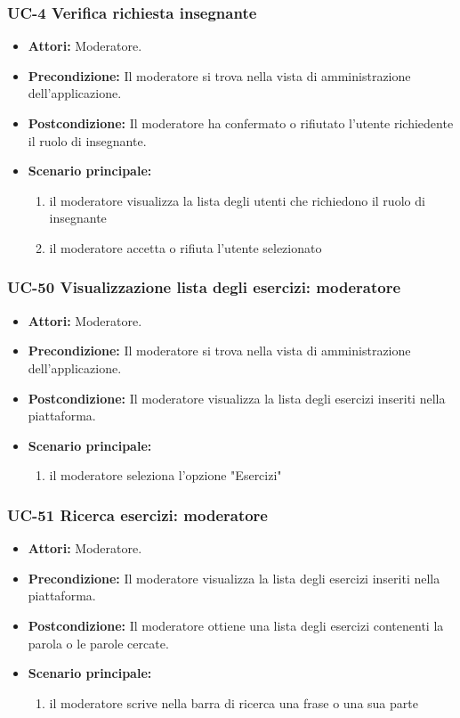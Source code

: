 \subsubsection{UC-4 Verifica richiesta insegnante}
		\begin{itemize}
			\item \textbf{Attori:} Moderatore.
			\item \textbf{Precondizione:} Il moderatore si trova nella vista di amministrazione dell'applicazione.
			\item \textbf{Postcondizione:} Il moderatore ha confermato o rifiutato l'utente richiedente il ruolo di insegnante.
			\item \textbf{Scenario principale:}
				\begin{enumerate}
					\item il moderatore visualizza la lista degli utenti che richiedono il ruolo di insegnante
					\item il moderatore accetta o rifiuta l'utente selezionato
				\end{enumerate}
		\end{itemize}		
			
\subsubsection{UC-50 Visualizzazione lista degli esercizi: moderatore}
	\begin{itemize}
		\item \textbf{Attori:} Moderatore.
		\item \textbf{Precondizione:} Il moderatore si trova nella vista di amministrazione dell'applicazione.
		\item \textbf{Postcondizione:} Il moderatore visualizza la lista degli esercizi inseriti nella piattaforma.
		\item \textbf{Scenario principale:}
			\begin{enumerate}
				\item il moderatore seleziona l'opzione "Esercizi"
			\end{enumerate}
	\end{itemize}
		
\subsubsection{UC-51 Ricerca esercizi: moderatore}
	\begin{itemize}
		\item \textbf{Attori:} Moderatore.
		\item \textbf{Precondizione:} Il moderatore visualizza la lista degli esercizi inseriti nella piattaforma.
		\item \textbf{Postcondizione:} Il moderatore ottiene una lista degli esercizi contenenti la parola o le parole cercate.
		\item \textbf{Scenario principale:}
			\begin{enumerate}
				\item il moderatore scrive nella barra di ricerca una frase o una sua parte
			\end{enumerate}
	\end{itemize}
	
